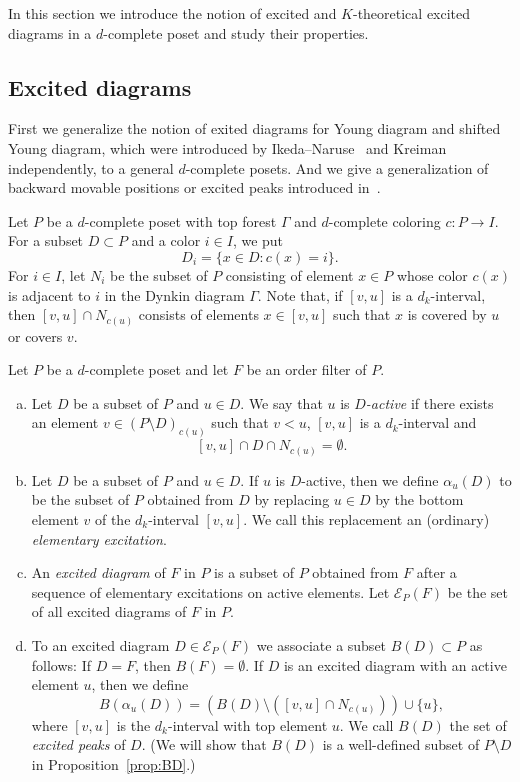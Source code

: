 \documentclass[ALCO,ThmDefs,Unicode,epreuves]{cedram}
\newcommand\EE{\mathcal{E}}
\begin{document}
In this section we introduce the notion of excited and $K$-theoretical excited diagrams 
in a $d$-complete poset and study their properties.

\subsection{%
Excited diagrams
}

First we generalize the notion of exited diagrams for Young diagram and shifted Young diagram, 
which were introduced by Ikeda--Naruse~\cite{IN1} and Kreiman~\cite{Kr1, Kr2} independently, 
to a general $d$-complete posets.
And we give a generalization of backward movable positions or excited peaks 
introduced in~\cite{IN2, KN, MPP}.

Let $P$ be a $d$-complete poset with top forest $\Gamma$ and $d$-complete coloring $c : P \to I$.
For a subset $D \subset P$ and a color $i \in I$, we put
$$
D_i = \{ x \in D : c(x) = i \}.
$$
For $i \in I$, let $N_i$ be the subset of $P$ consisting of element $x \in P$ whose color 
$c(x)$ is adjacent to $i$ in the Dynkin diagram $\Gamma$.
Note that, if $[v,u]$ is a $d_k$-interval, then $[v,u] \cap N_{c(u)}$ consists of elements $x \in [v,u]$ 
such that $x$ is covered by $u$ or covers $v$.

\begin{defi}
\label{def:excited}
Let $P$ be a $d$-complete poset and let $F$ be an order filter of $P$.
\begin{enumerate}[(a)]
\item\label{defi3.1_a} %
Let $D$ be a subset of $P$ and $u \in D$.
We say that $u$ is \emph{$D$-active} 
if there exists an element $v \in (P \setminus D)_{c(u)}$ 
such that $v < u$, $[v,u]$ is a $d_k$-interval and
$$
[v,u] \cap D \cap N_{c(u)} = \emptyset.
$$
\item\label{defi3.1_b} %
Let $D$ be a subset of $P$ and $u \in D$.
If $u$ is $D$-active, then we define $\alpha_u(D)$ to be the subset of $P$ obtained from $D$ by 
replacing $u \in D$ by the bottom element $v$ of the $d_k$-interval $[v,u]$.
We call this replacement an (ordinary) \emph{elementary excitation}.
\item\label{defi3.1_c} %
An \emph{excited diagram} of $F$ in $P$ is a subset of $P$ 
obtained from $F$ after a sequence of elementary excitations on active elements. 
Let $\EE_P(F)$ be the set of all excited diagrams of $F$ in $P$.
\item\label{defi3.1_d} %
To an excited diagram $D \in \EE_P(F)$ we associate a subset $B(D) \subset P$ as follows:
If $D = F$, then $B(F) = \emptyset$.
If $D$ is an excited diagram with an active element $u$, then we define
$$
B(\alpha_u(D))
 = 
\left( B(D) \setminus ([v,u] \cap N_{c(u)}) \right) \cup \{ u \},
$$
where $[v,u]$ is the $d_k$-interval with top element $u$.
We call $B(D)$ the set of \emph{excited peaks} of $D$.
(We will show that $B(D)$ is a well-defined subset of $P \setminus D$ in Proposition~\ref{prop:BD}.)
\end{enumerate}
\end{defi}
\end{document}
